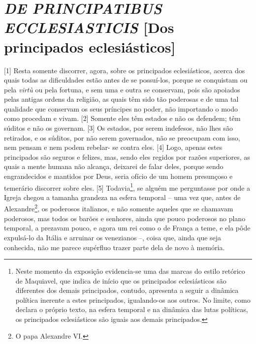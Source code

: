 \quebra\section{\emph{DE PRINCIPATIBUS ECCLESIASTICIS}\break
{[}Dos principados eclesiásticos{]}}

{[}1{]} Resta somente discorrer, agora, sobre os principados
eclesiásticos, acerca dos quais todas as dificuldades estão antes de se
possuí-los, porque se conquistam ou pela \emph{virtù} ou pela fortuna, e
sem uma e outra se conservam, pois são apoiados pelas antigas ordens da
religião, as quais têm sido tão poderosas e de uma tal qualidade que
conservam os seus príncipes no poder, não importando o modo como
procedam e vivam. {[}2{]} Somente eles têm estados e não os defendem;
têm súditos e não os governam. {[}3{]} Os estados, por serem indefesos,
não lhes são retirados, e os súditos, por não serem governados, não se
preocupam com isso, nem pensam e nem podem rebelar- se contra eles.
{[}4{]} Logo, apenas estes principados são seguros e felizes, mas, sendo
eles regidos por razões superiores, as quais a mente humana não alcança,
deixarei de falar deles, porque sendo engrandecidos e mantidos por Deus,
seria ofício de um homem presunçoso e temerário discorrer sobre eles.
{[}5{]} Todavia\footnote{Neste momento da exposição evidencia-se uma das
  marcas do estilo retórico de Maquiavel, que indica de início que os
  principados eclesiásticos são diferentes dos demais principados,
  contudo, apresenta a seguir a dinâmica política inerente a estes
  principados, igualando-os aos outros. No limite, como declara o
  próprio texto, na esfera temporal e na dinâmica das lutas políticas,
  os principados eclesiásticos são iguais aos demais principados.}, se
alguém me perguntasse por onde a Igreja chegou a tamanha grandeza na
esfera temporal -- uma vez que, antes de Alexandre\footnote{O papa
  Alexandre VI.}, os poderosos italianos, e não somente aqueles que se
chamavam poderosos, mas todos os barões e senhores, ainda que pouco
poderosos no plano temporal, a prezavam pouco, e agora um rei como o de
França a teme, e ela pôde expulsá-lo da Itália e arruinar os venezianos
--, coisa que, ainda que seja conhecida, não me parece supérfluo trazer
parte dela de novo à memória.

